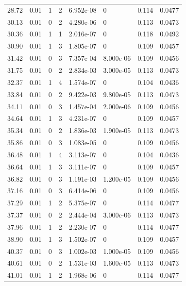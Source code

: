 \documentclass[preview]{standalone}
\begin{document}
{{{\begin{tabular}{L{1.2cm}C{1.2cm} C{0.3cm}C{0.5cm} C{1.4cm}C{1.4cm} C{1.4cm}C{1.4cm}}
  28.72  &  0.01  & 1     &  2 &  6.952e-08  & 0  & 0.114 &  0.0477   \\ 
  30.13  &  0.01  & 0     &  2 &  4.280e-06  & 0  & 0.113 &  0.0473   \\ 
  30.36  &  0.01  & 1     &  1 &  2.016e-07  & 0  & 0.118 &  0.0492   \\ 
  30.90  &  0.01  & 1     &  3 &  1.805e-07  & 0  & 0.109 &  0.0457   \\ 
  31.42  &  0.01  & 0     &  3 &  7.357e-04  & 8.000e-06  & 0.109 &  0.0456   \\ 
  31.75  &  0.01  & 0     &  2 &  2.834e-03  & 3.000e-05  & 0.113 &  0.0473   \\ 
  32.37  &  0.01  & 1     &  4 &  1.574e-07  & 0  & 0.104 &  0.0436   \\ 
  33.84  &  0.01  & 0     &  2 &  9.422e-03  & 9.800e-05  & 0.113 &  0.0473   \\ 
  34.11  &  0.01  & 0     &  3 &  1.457e-04  & 2.000e-06  & 0.109 &  0.0456   \\ 
  34.64  &  0.01  & 1     &  3 &  4.231e-07  & 0  & 0.109 &  0.0457   \\ 
  35.34  &  0.01  & 0     &  2 &  1.836e-03  & 1.900e-05  & 0.113 &  0.0473   \\ 
  35.86  &  0.01  & 0     &  3 &  1.083e-05  & 0  & 0.109 &  0.0456   \\ 
  36.48  &  0.01  & 1     &  4 &  3.113e-07  & 0  & 0.104 &  0.0436   \\ 
  36.64  &  0.01  & 1     &  3 &  3.111e-07  & 0  & 0.109 &  0.0457   \\ 
  36.82  &  0.01  & 0     &  3 &  1.191e-03  & 1.200e-05  & 0.109 &  0.0456   \\ 
  37.16  &  0.01  & 0     &  3 &  6.414e-06  & 0  & 0.109 &  0.0456   \\ 
  37.29  &  0.01  & 1     &  2 &  5.375e-07  & 0  & 0.114 &  0.0477   \\ 
  37.37  &  0.01  & 0     &  2 &  2.444e-04  & 3.000e-06  & 0.113 &  0.0473   \\ 
  37.96  &  0.01  & 1     &  2 &  2.230e-07  & 0  & 0.114 &  0.0477   \\ 
  38.90  &  0.01  & 1     &  3 &  1.502e-07  & 0  & 0.109 &  0.0457   \\ 
  40.37  &  0.01  & 0     &  3 &  1.002e-03  & 1.000e-05  & 0.109 &  0.0456   \\ 
  40.61  &  0.01  & 0     &  2 &  1.531e-03  & 1.600e-05  & 0.113 &  0.0473   \\ 
  41.01  &  0.01  & 1     &  2 &  1.968e-06  & 0  & 0.114 &  0.0477   \\ 

\end{tabular}}}}
\end{document}
